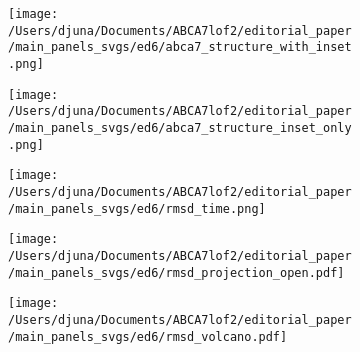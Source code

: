 \documentclass[12pt]{article}
\begin{document}
\begin{figure}[H]
    \begin{subfigure}[t]{.4\textwidth}
        \caption{}
        \texttt{[image: /Users/djuna/Documents/ABCA7lof2/editorial\_paper/main\_panels\_svgs/ed6/abca7\_structure\_with\_inset.png]}        
    \end{subfigure}
    \begin{subfigure}[t]{.25\textwidth}
        \caption{}
        \texttt{[image: /Users/djuna/Documents/ABCA7lof2/editorial\_paper/main\_panels\_svgs/ed6/abca7\_structure\_inset\_only.png]}        
    \end{subfigure}
    \begin{subfigure}[t]{.33\textwidth}
        \caption{}
        \texttt{[image: /Users/djuna/Documents/ABCA7lof2/editorial\_paper/main\_panels\_svgs/ed6/rmsd\_time.png]}        
    \end{subfigure}
    \hspace{1cm}
    \begin{subfigure}[t]{.25\textwidth}
        \caption{}
        \texttt{[image: /Users/djuna/Documents/ABCA7lof2/editorial\_paper/main\_panels\_svgs/ed6/rmsd\_projection\_open.pdf]}        
    \end{subfigure}
    \hspace{1cm}
    \begin{subfigure}[t]{.5\textwidth}
        \caption{}
        \texttt{[image: /Users/djuna/Documents/ABCA7lof2/editorial\_paper/main\_panels\_svgs/ed6/rmsd\_volcano.pdf]}        
    \end{subfigure}
\end{figure}
\end{document}
